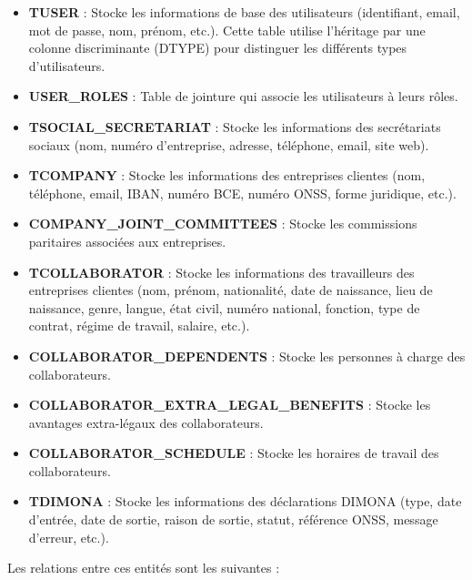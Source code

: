\documentclass[12pt,a4paper]{report}
\begin{document}
\begin{itemize}
  \item \textbf{TUSER} : Stocke les informations de base des utilisateurs (identifiant, email, mot de passe, nom, prénom, etc.). Cette table utilise l'héritage par une colonne discriminante (DTYPE) pour distinguer les différents types d'utilisateurs.

  \item \textbf{USER\_ROLES} : Table de jointure qui associe les utilisateurs à leurs rôles.

  \item \textbf{TSOCIAL\_SECRETARIAT} : Stocke les informations des secrétariats sociaux (nom, numéro d'entreprise, adresse, téléphone, email, site web).

  \item \textbf{TCOMPANY} : Stocke les informations des entreprises clientes (nom, téléphone, email, IBAN, numéro BCE, numéro ONSS, forme juridique, etc.).

  \item \textbf{COMPANY\_JOINT\_COMMITTEES} : Stocke les commissions paritaires associées aux entreprises.

  \item \textbf{TCOLLABORATOR} : Stocke les informations des travailleurs des entreprises clientes (nom, prénom, nationalité, date de naissance, lieu de naissance, genre, langue, état civil, numéro national, fonction, type de contrat, régime de travail, salaire, etc.).

  \item \textbf{COLLABORATOR\_DEPENDENTS} : Stocke les personnes à charge des collaborateurs.

  \item \textbf{COLLABORATOR\_EXTRA\_LEGAL\_BENEFITS} : Stocke les avantages extra-légaux des collaborateurs.

  \item \textbf{COLLABORATOR\_SCHEDULE} : Stocke les horaires de travail des collaborateurs.

  \item \textbf{TDIMONA} : Stocke les informations des déclarations DIMONA (type, date d'entrée, date de sortie, raison de sortie, statut, référence ONSS, message d'erreur, etc.).
\end{itemize}

Les relations entre ces entités sont les suivantes :
\end{document}
